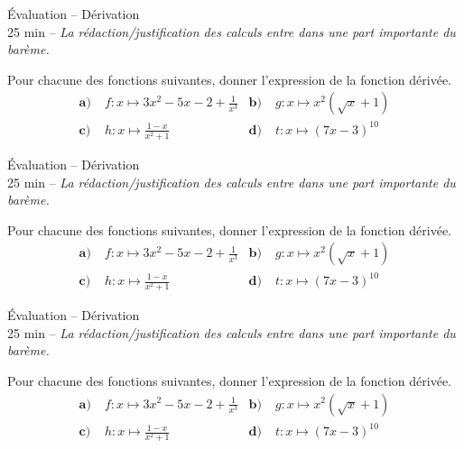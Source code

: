 \documentclass[11pt]{article}
\begin{document}
%
%
%

\begin{center}
  {\Huge Évaluation -- Dérivation}\\
  25 min -- \emph{La rédaction/justification des calculs entre dans une part
  importante du barème.}
\end{center}

\noindent Pour chacune des fonctions suivantes, donner l'expression de la fonction
dérivée.
\begin{align*}
  \textbf{a)}\; & f:x\mapsto 3x^2-5x-2+\frac{1}{x^3} &
  \textbf{b)}\; & g:x\mapsto x^2(\sqrt x+1) \\
  \textbf{c)}\; & h:x\mapsto \frac{1-x}{x^2+1} &
  \textbf{d)}\; & t:x\mapsto (7x-3)^{10}
\end{align*}
\vspace{2cm}

\begin{center}
  {\Huge Évaluation -- Dérivation}\\
  25 min -- \emph{La rédaction/justification des calculs entre dans une part
  importante du barème.}
\end{center}

\noindent Pour chacune des fonctions suivantes, donner l'expression de la fonction
dérivée.
\begin{align*}
  \textbf{a)}\; & f:x\mapsto 3x^2-5x-2+\frac{1}{x^3} &
  \textbf{b)}\; & g:x\mapsto x^2(\sqrt x+1) \\
  \textbf{c)}\; & h:x\mapsto \frac{1-x}{x^2+1} &
  \textbf{d)}\; & t:x\mapsto (7x-3)^{10}
\end{align*}
\vspace{2cm}

\begin{center}
  {\Huge Évaluation -- Dérivation}\\
  25 min -- \emph{La rédaction/justification des calculs entre dans une part
  importante du barème.}
\end{center}

\noindent Pour chacune des fonctions suivantes, donner l'expression de la fonction
dérivée.
\begin{align*}
  \textbf{a)}\; & f:x\mapsto 3x^2-5x-2+\frac{1}{x^3} &
  \textbf{b)}\; & g:x\mapsto x^2(\sqrt x+1) \\
  \textbf{c)}\; & h:x\mapsto \frac{1-x}{x^2+1} &
  \textbf{d)}\; & t:x\mapsto (7x-3)^{10}
\end{align*}
\vspace{2cm}
\end{document}
